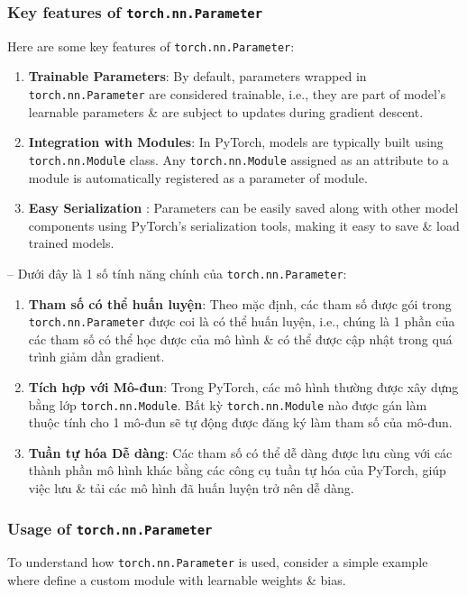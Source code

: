 \documentclass{article}
\begin{document}
\subsubsection{Key features of {\tt torch.nn.Parameter}}
Here are some key features of {\tt torch.nn.Parameter}:
\begin{enumerate}
    \item {\bf Trainable Parameters}: By default, parameters wrapped in {\tt torch.nn.Parameter} are considered trainable, i.e., they are part of model's learnable parameters \& are subject to updates during gradient descent.
    \item {\bf Integration with Modules}: In PyTorch, models are typically built using {\tt torch.nn.Module} class. Any {\tt torch.nn.Module} assigned as an attribute to a module is automatically registered as a parameter of module.
    \item {\bf Easy Serialization} : Parameters can be easily saved along with other model components using PyTorch's serialization tools, making it easy to save \& load trained models.
\end{enumerate}
-- Dưới đây là 1 số tính năng chính của {\tt torch.nn.Parameter}:
\begin{enumerate}
    \item {\bf Tham số có thể huấn luyện}: Theo mặc định, các tham số được gói trong {\tt torch.nn.Parameter} được coi là có thể huấn luyện, i.e., chúng là 1 phần của các tham số có thể học được của mô hình \& có thể được cập nhật trong quá trình giảm dần gradient.
    \item {\bf Tích hợp với Mô-đun}: Trong PyTorch, các mô hình thường được xây dựng bằng lớp {\tt torch.nn.Module}. Bất kỳ {\tt torch.nn.Module} nào được gán làm thuộc tính cho 1 mô-đun sẽ tự động được đăng ký làm tham số của mô-đun.
    \item {\bf Tuần tự hóa Dễ dàng}: Các tham số có thể dễ dàng được lưu cùng với các thành phần mô hình khác bằng các công cụ tuần tự hóa của PyTorch, giúp việc lưu \& tải các mô hình đã huấn luyện trở nên dễ dàng.
\end{enumerate}


\subsubsection{Usage of {\tt torch.nn.Parameter}}
To understand how {\tt torch.nn.Parameter} is used, consider a simple example where define a custom module with learnable weights \& bias.
\end{document}
